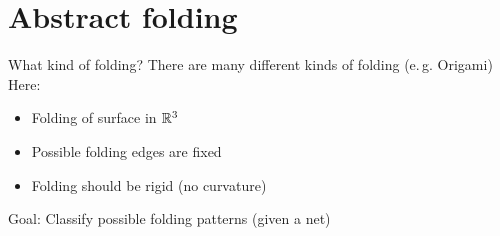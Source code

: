 \section{Abstract folding}
\frame{\tableofcontents[currentsection]}

\begin{frame}{What kind of folding?}
    \pause
    There are many different kinds of folding (e.\,g. Origami)
    \pause
    Here:
    \begin{itemize}
        \pause
        \item Folding of surface in $\mathbb{R}^3$
        \pause
        \item Possible folding edges are fixed
        \pause
        \item Folding should be rigid (no curvature)
    \end{itemize}

    \pause
    Goal: Classify possible folding patterns (given a net)

    \pause
    \begin{center}
    \end{center}

\end{frame}



